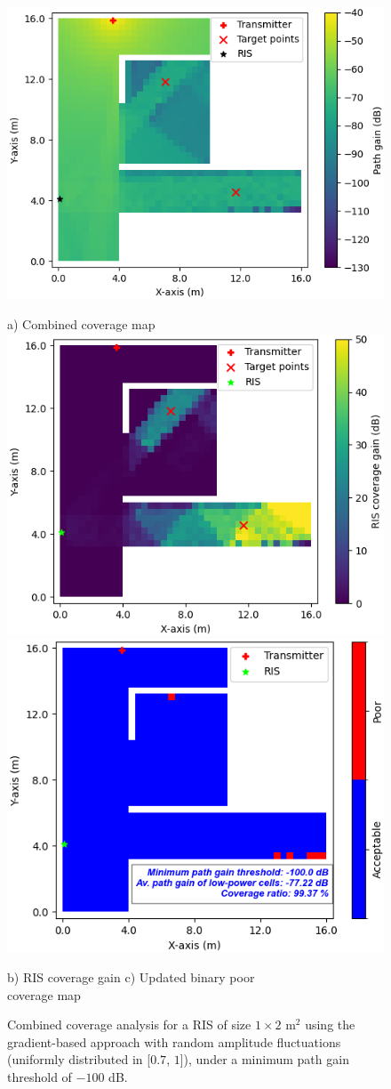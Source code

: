 \documentclass{IEEEoj}
\begin{document}
\begin{figure}
	\centering
	\includegraphics[width=0.8\linewidth]{Sim_Results/amp_change_Comb_cov_1x2_Gradient.png}
	
	a) Combined coverage map \\[5pt]
	
	\includegraphics[width=0.49\linewidth]{Sim_Results/amp_change_RIS_cov_gain_1x2_Gradient.png}
	\hfill
	\includegraphics[width=0.48\linewidth]{Sim_Results/amp_change_New_Binary_Cov_Map_1x2_Gradient.png}
	
	\hspace{10pt} b) RIS coverage gain \hspace{30pt} c) Updated binary poor \\ \hspace{140pt} coverage map
	\caption{Combined coverage analysis for a RIS of size $1 \times 2$ m$^2$ using the gradient-based approach with random amplitude fluctuations (uniformly distributed in [$0.7$, $1$]), under a minimum path gain threshold of $-100$ dB.}
	\label{amp_change_comb_cov_gradient}
\end{figure}
\end{document}
